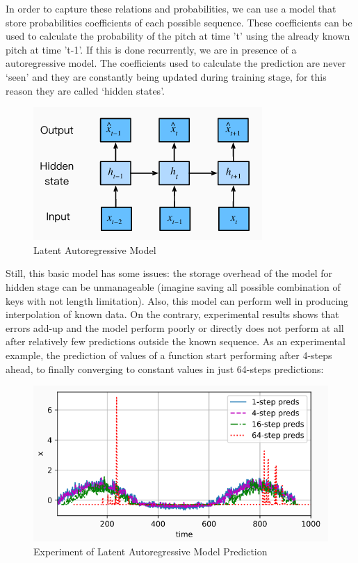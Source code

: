 In order to capture these relations and probabilities, we can use a model that store
probabilities coefficients of each possible sequence. These coefficients can be used to
calculate the probability of the pitch at time ’t’ using the already known pitch at time
’t-1’. If this is done recurrently, we are in presence of a autoregressive model. The
coefficients used to calculate the prediction are never ‘seen’ and they are constantly
being updated during training stage, for this reason they are called ‘hidden states’.

\begin{figure}[h!]
  \caption{Latent Autoregressive Model}
  \includegraphics[width=\linewidth]{image/fig_JDF12.png}
\end{figure}


Still, this basic model has some issues: the storage overhead of the model for hidden
stage can be unmanageable (imagine saving all possible combination of keys with not
length limitation). Also, this model can perform well in producing interpolation of known
data. On the contrary, experimental results shows that errors add-up and the model
perform poorly or directly does not perform at all after relatively few predictions outside
the known sequence. As an experimental example, the prediction of values of a
function start performing after 4-steps ahead, to finally converging to constant values
in just 64-steps predictions:

\begin{figure}[h!]
  \caption{Experiment of Latent Autoregressive Model Prediction}
  \includegraphics[width=\linewidth]{image/fig_JDF13.png}
\end{figure}


